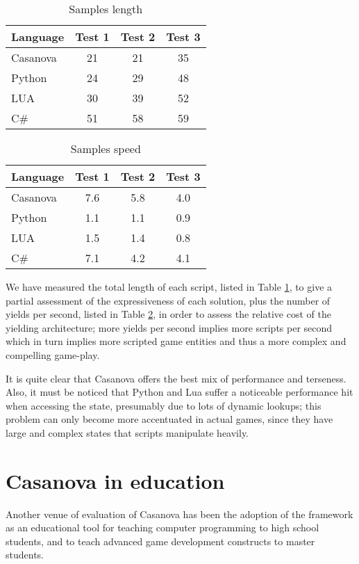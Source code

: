 \begin{table}[ht]
\caption{Samples length}
\centering
\begin{tabular}{ l | c c c }
   Language & Test 1 & Test 2 & Test 3\\
   \hline
   Casanova & 21 & 21 & 35  \\
   Python & 24 & 29 & 48 \\
   LUA & 30 & 39 & 52 \\
   C\# & 51 & 58 & 59 \\
\end{tabular}
\label{table:benchmarks_length}
\end{table}

\begin{table}[ht]
\caption{Samples speed}
\centering
\begin{tabular}{ l | c c c }
   Language & Test 1 & Test 2 & Test 3\\
   \hline
   Casanova & 7.6 & 5.8 & 4.0 \\
   Python & 1.1 & 1.1 & 0.9 \\
   LUA & 1.5 & 1.4 & 0.8 \\
   C\# & 7.1 & 4.2 & 4.1\\
\end{tabular}
\label{table:benchmarks_speed}
\end{table}

We have measured the total length of each script, listed in Table \ref{table:benchmarks_length}, to give a partial assessment of the expressiveness of each solution, plus the number of yields per second, listed in Table \ref{table:benchmarks_speed}, in order to assess the relative cost of the yielding architecture; more yields per second implies more scripts per second which in turn implies more scripted game entities and thus a more complex and compelling game-play.

It is quite clear that Casanova offers the best mix of performance and terseness. Also, it must be noticed that Python and Lua suffer a noticeable performance hit when accessing the state, presumably due to lots of dynamic lookups; this problem can only become more accentuated in actual games, since they have large and complex states that scripts manipulate heavily.


\section{Casanova in education}
Another venue of evaluation of Casanova has been the adoption of the framework as an educational tool for teaching computer programming to high school students, and to teach advanced game development constructs to master students.

